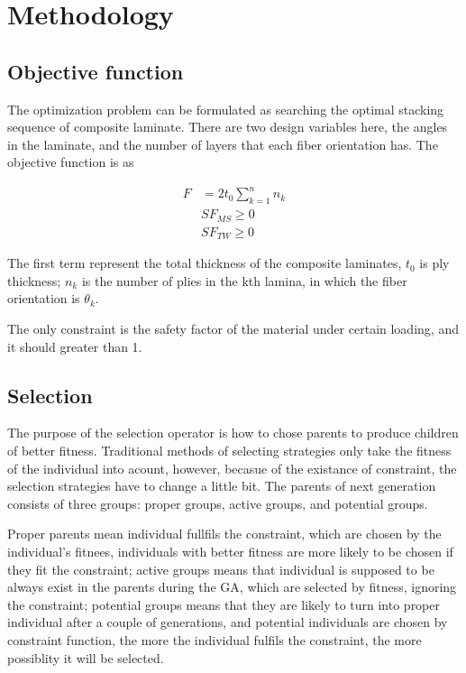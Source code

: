 
\section{Methodology}
\subsection{Objective function}
The optimization problem can be formulated as searching the optimal stacking
sequence of composite laminate.  There are two design variables here, the angles
in the laminate, and the number of layers that each fiber orientation has. The
objective function is as

\begin{equation}
	\begin{split}
    	F  &= 2t_0 \sum_{k=1}^n n_k  \\
    	   &SF_{MS} \geq 0  \\
    	   &SF_{TW} \geq 0 
	\end{split}
\end{equation}

	

The first term represent the total thickness of the composite laminates, $t_0$ is ply thickness;
$n_k$ is the number of plies in the kth lamina, in which the fiber orientation is $\theta_k$.

The only constraint is the safety factor of the material under certain loading, and it should
greater than 1.

\subsection{Selection}
The purpose of the selection operator is how to chose parents to produce children of better
fitness. Traditional methods of selecting strategies only take the fitness of the individual into
acount, however, becasue of the existance of constraint, the selection strategies have to change a
little bit. The parents of next generation consists of three groups: proper groups, active groups,
and potential groups. 

Proper parents mean individual fullfils the constraint, which are chosen by the individual's
fitnees, individuals with better fitness are more likely to be chosen if they fit the constraint;
active groups means that individual is supposed to be always exist in the parents during the GA,
which are selected by fitness, ignoring the constraint; potential groups means that they are likely
to turn into proper individual after a couple of generations, and potential individuals are chosen
by constraint function, the more the individual fulfils the constraint, the more possiblity it will
be selected.


